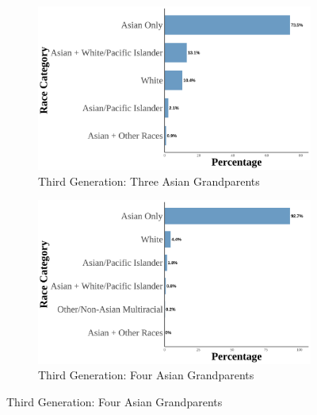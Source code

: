 \begin{landscape}
\begin{figure}[!htb]
\hspace*{\fill}
\begin{subfigure}{.4\textwidth}
\caption{Third Generation: Three Asian Grandparents}
\centering
\includegraphics[width=1\linewidth]{histogram_asian_american_race_thirdgen_threeasiangran.png}
\end{subfigure}
\hfill
\begin{subfigure}{.4\textwidth}
\caption{Third Generation: Four Asian Grandparents}
\centering
\includegraphics[width=1\linewidth]{histogram_asian_american_race_thirdgen_fourasiangran.png}
\end{subfigure}
\hspace*{\fill}


\end{figure}
\end{landscape}
